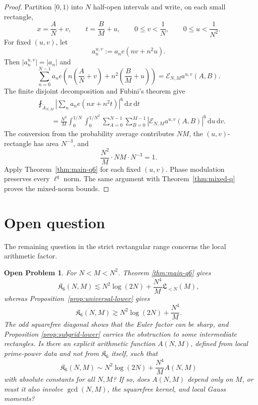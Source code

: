 \documentclass[11pt, twoside]{article}
\numberwithin{equation}{section}
\newtheorem{problem}[theorem]{Open Problem}
\theoremstyle{definition}
\newcommand{\cE}{\mathcal E}
\newcommand{\dd}{\,\mathrm d}
\newcommand{\Lcal}{\mathfrak L}
\newcommand{\Ksix}{\mathfrak K_6}
\begin{document}
\begin{proof}
Partition $[0,1)$ into $N$ half-open intervals and write, on each small
rectangle,
$$
x=\frac AN+v,\qquad t=\frac BM+u,\qquad 0\leq v<\frac1N,
\qquad
0\leq u<\frac1{N^2}.
$$
For fixed $(u,v)$, let
$$
a_n^{u,v}:=a_ne(nv+n^2u).
$$
Then $|a_n^{u,v}|=|a_n|$ and
$$
\sum_{n=0}^{N-1}a_ne\!\left(n\left(\frac AN+v\right)+n^2\left(\frac BM+u\right)\right)
=\cE_{N,M}a^{u,v}(A,B).
$$
The finite disjoint decomposition and Fubini's theorem give
$$
\begin{aligned}
&\fint_{\widetilde A_{N,M}}
\left|\sum_na_ne(nx+n^2t)\right|^6\dd x\dd t\\
&\qquad=
\frac{N^2}{M}
\int_0^{1/N}\int_0^{1/N^2}
\sum_{A=0}^{N-1}\sum_{B=0}^{M-1}
|\cE_{N,M}a^{u,v}(A,B)|^6\dd u\dd v.
\end{aligned}
$$
The conversion from the probability average contributes $NM$, the
$(u,v)$-rectangle has area $N^{-3}$, and
$$
\frac{N^2}{M}\cdot NM\cdot N^{-3}=1.
$$
Apply Theorem~\ref{thm:main-q6} for each fixed $(u,v)$.
Phase modulation preserves every $\ell^q$ norm.
The same argument with Theorem~\ref{thm:mixed-q} proves the mixed-norm bounds.
\end{proof}

\section{Open question}\label{sec:conclusion}

The remaining question in the strict rectangular range concerns the local
arithmetic factor.

\begin{problem}
For $N<M<N^2$. Theorem
\ref{thm:main-q6} gives
$$
\Ksix(N,M)\lesssim N^2\log(2N)+\frac{N^4}{M}\Lcal_{<N}(M),
$$
whereas Proposition~\ref{prop:universal-lower} gives
$$
\Ksix(N,M)
\gtrsim
N^2\log(2N)+\frac{N^4}{M}.
$$
The odd squarefree diagonal shows that the Euler factor can be sharp, and
Proposition \ref{prop:subgrid-lower} carries the obstruction to some
intermediate rectangles.  Is there an explicit arithmetic function $A(N,M)$,
defined from local prime-power data and not from $\Ksix$ itself, such that
$$
\Ksix(N,M)
\sim
N^2\log(2N)+\frac{N^4}{M}A(N,M)
$$
with absolute constants for all $N,M$?  If so, does $A(N,M)$ depend only on
$M$, or must it also involve $\gcd(N,M)$, the squarefree kernel, and local
Gauss moments?
\end{problem}
\end{document}
